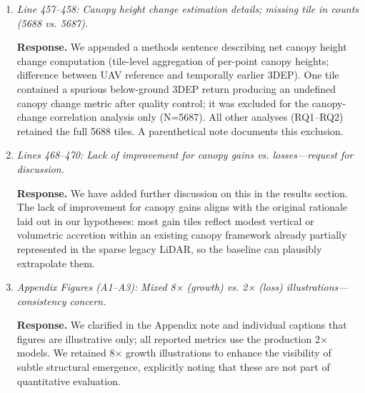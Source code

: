 \documentclass[11pt]{article}
\newcommand{\response}{\textbf{Response.} }
\begin{document}
\begin{enumerate}
  \item \emph{Line 457–458: Canopy height change estimation details; missing tile in counts (5688 vs. 5687).}

  \response We appended a methods sentence describing net canopy height change computation (tile-level aggregation of per-point canopy heights; difference between UAV reference and temporally earlier 3DEP). One tile contained a spurious below-ground 3DEP return producing an undefined canopy change metric after quality control; it was excluded for the canopy-change correlation analysis only (N=5687). All other analyses (RQ1–RQ2) retained the full 5688 tiles. A parenthetical note documents this exclusion.

  \item \emph{Lines 468–470: Lack of improvement for canopy gains vs. losses—request for discussion.}

  \response We have added further discussion on this in the results section. The lack of improvement for canopy gains aligns with the original rationale laid out in our hypotheses: most gain tiles reflect modest vertical or volumetric accretion within an existing canopy framework already partially represented in the sparse legacy LiDAR, so the baseline can plausibly extrapolate them.

  \item \emph{Appendix Figures (A1–A3): Mixed 8× (growth) vs. 2× (loss) illustrations—consistency concern.}

  \response We clarified in the Appendix note and individual captions that figures are illustrative only; all reported metrics use the production 2× models. We retained 8× growth illustrations to enhance the visibility of subtle structural emergence, explicitly noting that these are not part of quantitative evaluation.

\end{enumerate}
\end{document}
